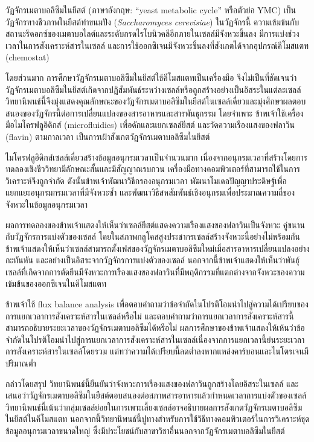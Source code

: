 \documentclass{article}
\begin{document}

วัฏจักรเมตาบอลิซึมในยีสต์ (ภาษาอังกฤษ: ``yeast metabolic cycle'' หรือตัวย่อ YMC) เป็นวัฏจักรทางชีวภาพในยีสต์ทำขนมปัง (\textit{Saccharomyces cerevisiae}) ในวัฏจักรนี้ ความเข้มข้นกับสถานะรีดอกซ์ของเมตาบอไลต์และระดับกรดไรโบนิวคลีอีกภายในเซลล์มีจังหวะขึ้นลง มีการแบ่งช่วงเวลาในการสังเคราะห์สารในเซลล์ และการใช้ออกซิเจนมีจังหวะขึ้นลงที่สังเกตได้จากอุปกรณ์คีโมสแตท (chemostat)

โดยส่วนมาก การศึกษาวัฏจักรเมตาบอลิซึมในยีสต์ใช้คีโมสแตทเป็นเครื่องมือ จึงไม่เป็นที่ชัดเจนว่าวัฏจักรเมตาบอลิซึมในยีสต์เกิดจากปฏิสัมพันธ์ระหว่างเซลล์หรือถูกสร้างอย่างเป็นอิสระในแต่ละเซลล์ วิทยานิพนธ์นี้จึงมุ่งแสดงคุณลักษณะของวัฏจักรเมตาบอลิซึมในยีสต์ในเซลล์เดี่ยวและมุ่งศึกษาผลตอบสนองของวัฏจักรนี้ต่อการเปลี่ยนแปลงของสารอาหารและสารพันธุกรรม โดยจำเพาะ ข้าพเจ้าใช้เครื่องมือไมโครฟลูอิดิกส์ (microfluidics) เพื่อดักและแยกเซลล์ยีสต์ และวัดความเรืองแสงของฟลาวิน (flavin) ตามกาลเวลา เป็นการเฝ้าสังเกตวัฏจักรเมตาบอลิซึมในยีสต์

ไมโครฟลูอิดิกส์เซลล์เดี่ยวสร้างข้อมูลอนุกรมเวลาเป็นจำนวนมาก เนื่องจากอนุกรมเวลาที่สร้างโดยการทดลองเชิงชีววิทยามีลักษณะสั้นและมีสัญญาณรบกวน เครื่องมือทางคอมพิวเตอร์ที่สามารถใช้ในการวิเคราะห์จึงถูกจำกัด ดังนั้นข้าพเจ้าพัฒนาวิธีกรองอนุกรมเวลา พัฒนาโมเดลปัญญาประดิษฐ์เพื่อแยกแยะอนุกรมกรมเวลาที่มีจังหวะซ้ำ และพัฒนาวิธีสหสัมพันธ์เชิงอนุกรมเพื่อประมาณความถี่ของจังหวะในข้อมูลอนุกรมเวลา

ผลการทดลองของข้าพเจ้าแสดงให้เห็นว่าเซลล์ยีสต์แสดงความเรืองแสงของฟลาวินเป็นจังหวะ คู่ขนานกับวัฏจักรการแบ่งตัวของเซลล์ โดยในสภาพกลูโคสสูงประชากรเซลล์สร้างจังหวะนี้อย่างไม่พร้อมกัน ข้าพเจ้าแสดงให้เห็นว่าเซลล์สามารถตั้งเฟสของวัฏจักรเมตาบอลิซึมใหม่เมื่อสารอาหารเปลี่ยนแปลงอย่างกะทันหัน และอย่างเป็นอิสระจากวัฏจักรการแบ่งตัวของเซลล์ นอกจากนี้ข้าพเจ้าแสดงให้เห็นว่าพันธุ์เซลล์ที่เกิดจากการตัดยีนมีจังหวะการเรืองแสงของฟลาวินที่มีพฤติกรรมที่แตกต่างจากจังหวะของความเข้มข้นของออกซิเจนในคีโมสแตท

ข้าพเจ้าใช้ flux balance analysis เพื่อตอบคำถามว่าข้อจำกัดในโปรติโอมนำไปสู่ความได้เปรียบของการแยกเวลาการสังเคราะห์สารในเซลล์หรือไม่ และตอบคำถามว่าการแยกเวลาการสังเคราะห์สารนี้สามารถอธิบายระยะเวลาของวัฏจักรเมตาบอลิซึมได้หรือไม่ ผลการศึกษาของข้าพเจ้าแสดงให้เห้นว่าข้อจำกัดในโปรติโอมนำไปสู่การแยกเวลาการสังเคราะห์สารในเซลล์เนื่องจากการแยกเวลานี้ย่นระยะเวลาการสังเคราะห์สารในเซลล์โดยรวม แต่ทว่าความได้เปรียบนี้ลดต่ำลงหากแหล่งคาร์บอนและไนโตรเจนมีปริมาณต่ำ

กล่าวโดยสรุป วิทยานิพนธ์นี้ยืนยันว่าจังหวะการเรืองแสงของฟลาวินถูกสร้างโดยอิสระในเซลล์ และเสนอว่าวัฏจักรเมตาบอลิซึมในยีสต์ตอบสนองต่อสภาพสารอาหารแล้วกำหนดเวลาการแบ่งตัวของเซลล์ วิทยานิพนธ์นี้เน้นว่ากลุ่มเซลล์ย่อยในการเพาะเลี้ยงเซลล์อาจอธิบายผลการสังเกตวัฏจักรเมตาบอลิซึมในยีสต์ในคีโมสแตท นอกจากนี้วิทยานิพนธ์นี้ปูทางสำหรับการใช้วิธีทางคอมพิวเตอร์ในการวิเคราะห์ชุดข้อมูลอนุกรมเวลาขนาดใหญ่ ซึ่งมีประโยชน์กับสาขาวิชาอื่นนอกจากวัฏจักรเมตาบอลิซึมในยีสต์
\end{document}
